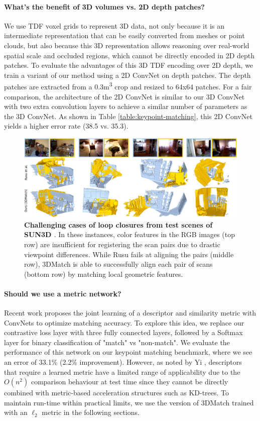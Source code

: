 \documentclass[10pt,twocolumn,letterpaper]{article}
\newcommand{\mypara}{\vspace*{-3mm}\paragraph}
\begin{document}
\mypara{What's the benefit of 3D volumes vs. 2D depth patches?}
We use TDF voxel grids to represent 3D data, not only because it is an intermediate representation that can be easily converted from meshes or point clouds, but also because this 3D representation allows reasoning over real-world spatial scale and occluded regions, which cannot be directly encoded in 2D depth patches.
To evaluate the advantages of this 3D TDF encoding over 2D depth, we train a variant of our method using a 2D ConvNet on depth patches. The depth patches are extracted from a 0.3m\textsuperscript{3} crop and resized to 64x64 patches. For a fair comparison, the architecture of the 2D ConvNet is similar to our 3D ConvNet with two extra convolution layers to achieve a similar number of parameters as the 3D ConvNet. As shown in Table \ref{table:keypoint-matching}, this 2D ConvNet yields a higher error rate (38.5 vs. 35.3).


\begin{figure}[t]
\vspace{-5mm}
\centering
\includegraphics[width=1\linewidth]{images/fragment-matching-examples.jpg}
\caption{{\bf Challenging cases of loop closures from test scenes of SUN3D \cite{SUN3D}}. In these instances, color features in the RGB images (top row) are insufficient for registering the scan pairs due to drastic viewpoint differences. While Rusu \etal \cite{rusu2009fast} fails at aligning the pairs (middle row), 3DMatch is able to successfully align each pair of scans (bottom row) by matching local geometric features.}

\label{fig:loop-closure-example}
\end{figure}


\mypara{Should we use a metric network?} 
Recent work \cite{han2015matchnet} proposes the joint learning of a descriptor and similarity metric with ConvNets to optimize matching accuracy. To explore this idea, we replace our contrastive loss layer with three fully connected layers, followed by a Softmax layer for binary classification of "match" vs "non-match". We evaluate the performance of this network on our keypoint matching benchmark, where we see an error of 33.1\% (2.2\% improvement).
However, as noted by Yi \etal \cite{yi2016lift}, descriptors that require a learned metric have a limited range of applicability due to the $O(n^2)$ comparison behaviour at test time since they cannot be directly combined with metric-based acceleration structures such as KD-trees. To maintain run-time within practical limits, we use the version of 3DMatch trained with an $\ell_2$ metric in the following sections.
\end{document}
